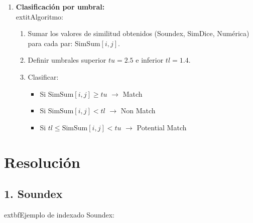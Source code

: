 \documentclass{article}
\begin{document}
\begin{enumerate}
    \item \textbf{Clasificación por umbral:}\\
    	extit{Algoritmo:}
    \begin{enumerate}
        \item Sumar los valores de similitud obtenidos (Soundex, SimDice, Numérica) para cada par: $\text{SimSum}[i,j]$.
        \item Definir umbrales superior $tu=2.5$ e inferior $tl=1.4$.
        \item Clasificar:
        \begin{itemize}
            \item Si $\text{SimSum}[i,j] \geq tu$ $\rightarrow$ Match
            \item Si $\text{SimSum}[i,j] < tl$ $\rightarrow$ Non Match
            \item Si $tl \leq \text{SimSum}[i,j] < tu$ $\rightarrow$ Potential Match
        \end{itemize}
    \end{enumerate}
\end{enumerate}

\section*{Resolución}

\subsection*{1. Soundex}

	extbf{Ejemplo de indexado Soundex:}
\end{document}
